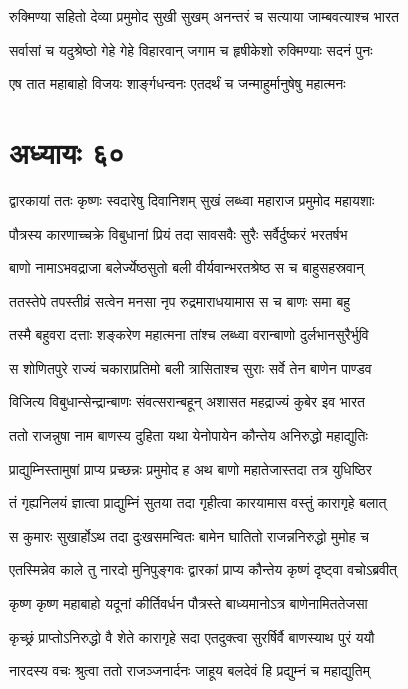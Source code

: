 \twolineshloka
{रुक्मिण्या सहितो देव्या प्रमुमोद सुखी सुखम्}
{अनन्तरं च सत्याया जाम्बवत्याश्च भारत}


\twolineshloka
{सर्वासां च यदुश्रेष्ठो गेहे गेहे विहारवान्}
{जगाम च हृषीकेशो रुक्मिण्याः सदनं पुनः}


\twolineshloka
{एष तात महाबाहो विजयः शार्ङ्गधन्वनः}
{एतदर्थं च जन्माहुर्मानुषेषु महात्मनः}


\chapter{अध्यायः ६०}
\twolineshloka
{द्वारकायां ततः कृष्णः स्वदारेषु दिवानिशम्}
{सुखं लब्ध्वा महाराज प्रमुमोद महायशाः}


\twolineshloka
{पौत्रस्य कारणाच्चक्रे विबुधानां प्रियं तदा}
{सावसवैः सुरैः सर्वैर्दुष्करं भरतर्षभ}


\twolineshloka
{बाणो नामाऽभवद्राजा बलेर्ज्येष्ठसुतो बली}
{वीर्यवान्भरतश्रेष्ठ स च बाहुसहस्रवान्}


\twolineshloka
{ततस्तेपे तपस्तीव्रं सत्वेन मनसा नृप}
{रुद्रमाराधयामास स च बाणः समा बहु}


\twolineshloka
{तस्मै बहुवरा दत्ताः शङ्करेण महात्मना}
{तांश्च लब्ध्वा वरान्बाणो दुर्लभानसुरैर्भुवि}


\twolineshloka
{स शोणितपुरे राज्यं चकाराप्रतिमो बली}
{त्रासिताश्च सुराः सर्वे तेन बाणेन पाण्डव}


\twolineshloka
{विजित्य विबुधान्सेन्द्रान्बाणः संवत्सरान्बहून्}
{अशासत महद्राज्यं कुबेर इव भारत}


\twolineshloka
{ततो राजन्नुषा नाम बाणस्य दुहिता यथा}
{येनोपायेन कौन्तेय अनिरुद्धो महाद्युतिः}


\twolineshloka
{प्राद्युम्निस्तामुषां प्राप्य प्रच्छन्नः प्रमुमोद ह}
{अथ बाणो महातेजास्तदा तत्र युधिष्ठिर}


\twolineshloka
{तं गृह्यनिलयं ज्ञात्वा प्राद्युम्निं सुतया तदा}
{गृहीत्वा कारयामास वस्तुं कारागृहे बलात्}


\twolineshloka
{स कुमारः सुखार्होऽथ तदा दुःखसमन्वितः}
{बामेन घातितो राजन्ननिरुद्धो मुमोह च}


\twolineshloka
{एतस्मिन्नेव काले तु नारदो मुनिपुङ्गवः}
{द्वारकां प्राप्य कौन्तेय कृष्णं दृष्ट्वा वचोऽब्रवीत्}


\twolineshloka
{कृष्ण कृष्ण महाबाहो यदूनां कीर्तिवर्धन}
{पौत्रस्ते बाध्यमानोऽत्र बाणेनामिततेजसा}


\twolineshloka
{कृच्छ्रं प्राप्तोऽनिरुद्धो वै शेते कारागृहे सदा}
{एतदुक्त्वा सुरर्षिर्वै बाणस्याथ पुरं ययौ}


\twolineshloka
{नारदस्य वचः श्रुत्वा ततो राजञ्जनार्दनः}
{जाहूय बलदेवं हि प्रद्युम्नं च महाद्युतिम्}



